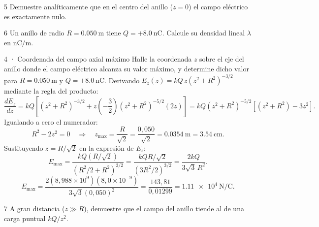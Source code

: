 \documentclass[11pt]{article}
\begin{document}
\begin{eReto}{5 }
Demuestre analíticamente que en el centro del anillo ($z=0$) el campo eléctrico es exactamente nulo.
\end{eReto}

\begin{eReto}{6 }
Un anillo de radio $R=\SI{0,050}{\metre}$ tiene $Q=+\SI{8,0}{\nano\coulomb}$. Calcule su densidad lineal $\lambda$ en $\mathrm{nC/m}$.
\end{eReto}


\begin{eResuelto}{4 · Coordenada del campo axial máximo}
Halle la coordenada $z$ sobre el eje del anillo donde el campo eléctrico alcanza su valor máximo, y determine dicho valor para $R=\SI{0,050}{\metre}$ y $Q=+\SI{8,0}{\nano\coulomb}$.
Derivando $E_z(z)=kQ\,z(z^2+R^2)^{-3/2}$ mediante la regla del producto:
\[ \frac{dE_z}{dz} = kQ\left[(z^2+R^2)^{-3/2} + z\left(-\frac{3}{2}\right)(z^2+R^2)^{-5/2}(2z)\right] = kQ(z^2+R^2)^{-5/2}\left[(z^2+R^2) - 3z^2\right]. \]
Igualando a cero el numerador:
\[ R^2 - 2z^2 = 0 \quad\Rightarrow\quad z_{\text{max}} = \frac{R}{\sqrt{2}} = \frac{0{,}050}{\sqrt{2}} = \SI{0,0354}{\metre} = \SI{3,54}{\centi\metre}. \]
Sustituyendo $z=R/\sqrt{2}$ en la expresión de $E_z$:
\[ E_{\text{max}} = \frac{kQ(R/\sqrt{2})}{\left(R^2/2 + R^2\right)^{3/2}} = \frac{kQR/\sqrt{2}}{(3R^2/2)^{3/2}} = \frac{2kQ}{3\sqrt{3}\,R^2}. \]
\[ E_{\text{max}} = \frac{2(8{,}988\times10^9)(8{,}0\times10^{-9})}{3\sqrt{3}(0{,}050)^2} = \frac{143{,}81}{0{,}01299} = \SI{1,11e4}{\newton\per\coulomb}. \]
\end{eResuelto}

\begin{eReto}{7 }
A gran distancia ($z\gg R$), demuestre que el campo del anillo tiende al de una carga puntual $kQ/z^2$.
\end{eReto}

\end{document}
